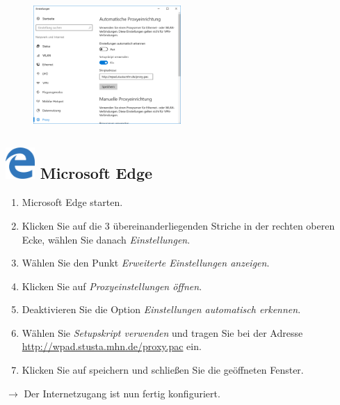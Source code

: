 \documentclass[a4paper,12pt]{scrartcl}
\begin{document}
\newpage
\begin{figure}
	\begin{center}
		\includegraphics[width=0.5\textwidth,keepaspectratio]{Bilder/Proxy_Edge}
	\end{center}
\end{figure}

\subsection*{\includegraphics[height=1.2cm,keepaspectratio]{Bilder/Mcrosoft_Edge_logo} Microsoft Edge}
\begin{enumerate}
	\item Microsoft Edge starten.
	\item Klicken Sie auf die 3 übereinanderliegenden Striche in der rechten oberen Ecke, wählen Sie danach \emph{Einstellungen}.
	\item Wählen Sie den Punkt \emph{Erweiterte Einstellungen anzeigen}.
	\item Klicken Sie auf \emph{Proxyeinstellungen öffnen}.
	\item Deaktivieren Sie die Option \emph{Einstellungen automatisch erkennen}.
	\item Wählen Sie \emph{Setupskript verwenden} und tragen Sie bei der Adresse \\ \url{http://wpad.stusta.mhn.de/proxy.pac} ein.
	\item Klicken Sie auf speichern und schließen Sie die geöffneten Fenster.
\end{enumerate}
$\rightarrow$ Der Internetzugang ist nun fertig konfiguriert.
\end{document}
